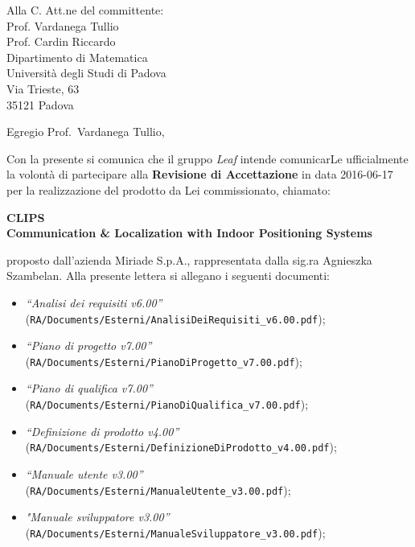 \documentclass[a4paper,12pt]{letteracdp}
\author{Andrea Tombolato}
\date{16 Giugno 2016}
\begin{document}
	\begin{letter}{
		Alla C. Att.ne del committente: \\
		Prof. Vardanega Tullio \\
		Prof. Cardin Riccardo \\
		Dipartimento di Matematica \\
		Università degli Studi di Padova \\
		Via Trieste, 63 \\
		35121 Padova}
		
		\opening{Egregio Prof.~Vardanega Tullio,}
		Con la presente si comunica che il gruppo \textit{Leaf} intende comunicarLe ufficialmente la volontà di partecipare alla \textbf{Revisione di Accettazione} in data 2016-06-17 per la realizzazione del prodotto da Lei commissionato, chiamato:
\begin{center}
	\textbf{CLIPS \\ Communication \& Localization with Indoor Positioning Systems}
\end{center}
proposto dall'azienda Miriade S.p.A., rappresentata dalla sig.ra Agnieszka Szambelan.
Alla presente lettera si allegano i seguenti documenti:
%
\begin{itemize}
	\item \textit{“Analisi dei requisiti v6.00”} \\(\texttt{RA/Documents/Esterni/AnalisiDeiRequisiti\_v6.00.pdf});

	\item \textit{“Piano di progetto v7.00”} \\(\texttt{RA/Documents/Esterni/PianoDiProgetto\_v7.00.pdf});

	\item \textit{“Piano di qualifica v7.00”} \\(\texttt{RA/Documents/Esterni/PianoDiQualifica\_v7.00.pdf});
	
	\item \textit{“Definizione di prodotto v4.00”} \\(\texttt{RA/Documents/Esterni/DefinizioneDiProdotto\_v4.00.pdf});
	
	\item \textit{“Manuale utente v3.00”} \\(\texttt{RA/Documents/Esterni/ManualeUtente\_v3.00.pdf});
	
	\item \textit{"Manuale sviluppatore v3.00”} \\(\texttt{RA/Documents/Esterni/ManualeSviluppatore\_v3.00.pdf});
	

\end{itemize}
\end{letter}
\end{document}
